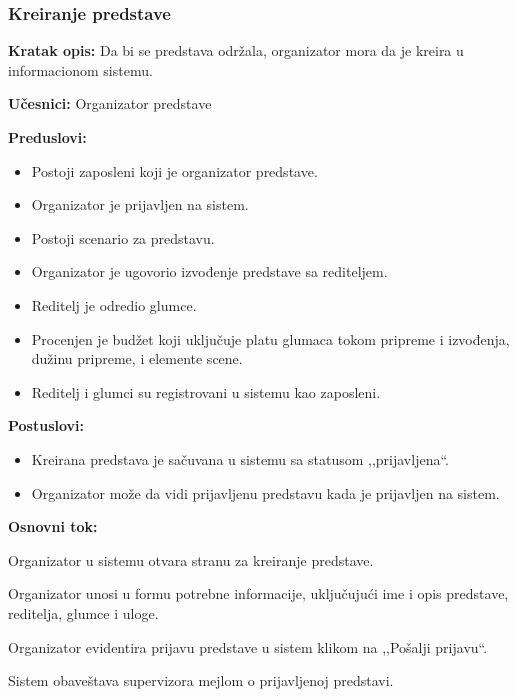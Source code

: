 \documentclass[a4paper]{article}
\begin{document}
\subsubsection{Kreiranje predstave} \label{Kreiranje predstave}
\noindent\textbf{Kratak opis:} Da bi se predstava održala, organizator mora da je kreira u informacionom sistemu. 

\noindent\textbf{Učesnici:} Organizator predstave

\noindent\textbf{Preduslovi:}
  \begin{itemize}
    \item Postoji zaposleni koji je organizator predstave.
    \item Organizator je prijavljen na sistem.
    \item Postoji scenario za predstavu.
    \item Organizator je ugovorio izvođenje predstave sa rediteljem.
    \item Reditelj je odredio glumce.
    \item Procenjen je budžet koji uključuje platu glumaca tokom pripreme i izvođenja, dužinu pripreme, i elemente scene.
    \item Reditelj i glumci su registrovani u sistemu kao zaposleni.
  \end{itemize}

\noindent\textbf{Postuslovi:} 
  \begin{itemize}
    \item Kreirana predstava je sačuvana u sistemu sa statusom ,,prijavljena``.
    \item Organizator može da vidi prijavljenu predstavu kada je prijavljen na sistem.
  \end{itemize}

\noindent\textbf{Osnovni tok:}
  \begin{legal}
    \item Organizator u sistemu otvara stranu za kreiranje predstave.
    \item Organizator unosi u formu potrebne informacije, uključujući ime i opis predstave, reditelja, glumce i uloge. 
    \item Organizator evidentira prijavu predstave u sistem klikom na ,,Pošalji prijavu``. 
    \item Sistem obaveštava supervizora mejlom o prijavljenoj predstavi.
  \end{legal}
\end{document}
